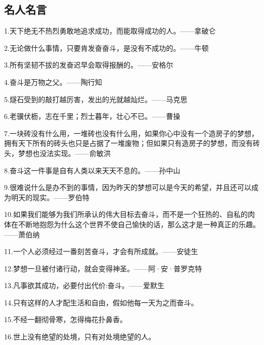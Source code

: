 \documentclass[UTF8]{ctexart}
\begin{document}
\subsection{名人名言}
1.天下绝无不热烈勇敢地追求成功，而能取得成功的人。——拿破仑\par
2.无论做什么事情，只要肯发奋奋斗，是没有不成功的。——牛顿\par
3.所有坚韧不拔的发奋迟早会取得报酬的。——安格尔\par
4.奋斗是万物之父。——陶行知\par
5.燧石受到的敲打越厉害，发出的光就越灿烂。——马克思\par
6.老骥伏枥，志在千里；烈士暮年，壮心不已。——曹操\par
7.一块砖没有什么用，一堆砖也没有什么用，如果你心中没有一个造房子的梦想，拥有天下所有的砖头也只是占据了一堆废物；但如果只有造房子的梦想，而没有砖头，梦想也没法实现。——俞敏洪\par
8.奋斗这一件事是自有人类以来天天不息的。——孙中山\par
9.很难说什么是办不到的事情，因为昨天的梦想可以是今天的希望，并且还可以成为明天的现实。——罗伯特\par
10.如果我们能够为我们所承认的伟大目标去奋斗，而不是一个狂热的、自私的肉体在不断地抱怨为什么这个世界不使自己愉快的话，那么这才是一种真正的乐趣。——萧伯纳\par
11.一个人必须经过一番刻苦奋斗，才会有所成就。——安徒生\par\par
12.梦想一旦被付诸行动，就会变得神圣。——阿·安·普罗克特\par
13.凡事欲其成功，必要付出代价:奋斗。——爱默生\par
14.只有这样的人才配生活和自由，假如他每一天为之而奋斗。\par
15.不经一翻彻骨寒，怎得梅花扑鼻香。\par
16.世上没有绝望的处境，只有对处境绝望的人。\par
\end{document}
